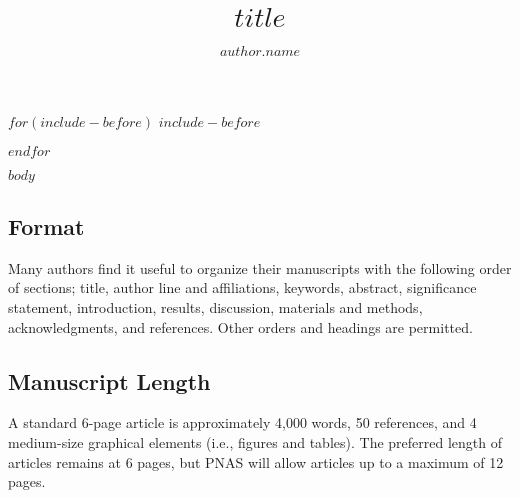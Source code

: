 \documentclass[9pt,twocolumn,twoside,lineno]{pnas-new}
\title{$title$}
\author[$author.affilnum$]{$author.name$}
\affil[$affiliation.key$]{$affiliation.name$}
\begin{document}
\maketitle
\thispagestyle{firststyle}


$for(include-before)$
$include-before$

$endfor$

$body$

\subsection*{Format}

Many authors find it useful to organize their manuscripts with the following order of sections;  title, author line and affiliations, keywords, abstract, significance statement, introduction, results, discussion, materials and methods, acknowledgments, and references. Other orders and headings are permitted.

\subsection*{Manuscript Length}

A standard 6-page article is approximately 4,000 words, 50 references, and 4 medium-size graphical elements (i.e., figures and tables). The preferred length of articles remains at 6 pages, but PNAS will allow articles up to a maximum of 12 pages.


\showmatmethods{} %


\showacknow{} %


\end{document}
